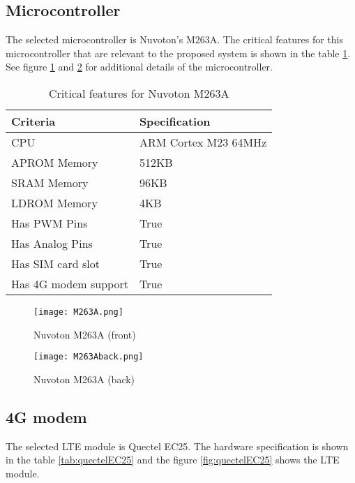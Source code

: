 \documentclass[../thesis.tex]{subfiles}
\begin{document}
\subsection{Microcontroller}

The selected microcontroller is Nuvoton's M263A. The critical features for this microcontroller that are relevant to the proposed system is shown in the table \ref{tab:microcontrollerSpecification}. See figure \ref{fig:m263A} and \ref{fig:m263Aback} for additional details of the microcontroller. 

\begin{table}[h!]
	\begin{center}
		\caption{Critical features for Nuvoton M263A}
		\label{tab:microcontrollerSpecification}
		\begin{tabular}{l|l}
			\toprule
			\textbf{Criteria} & \textbf{Specification}\\
			\midrule
			CPU & ARM Cortex M23 64MHz\\
			APROM Memory & 512KB\\
			SRAM Memory & 96KB\\
			LDROM Memory & 4KB\\
			Has PWM Pins & True\\
			Has Analog Pins & True\\
			Has SIM card slot & True\\
			Has 4G modem support & True\\
			\bottomrule
		\end{tabular}
	\end{center}
\end{table}

\begin{figure}[!ht]
	\texttt{[image: M263A.png]}
	\caption{Nuvoton M263A (front) \cite{Nuvoton}}
	\label{fig:m263A}
\end{figure}

\begin{figure}[!ht]
	\texttt{[image: M263Aback.png]}
	\caption{Nuvoton M263A (back) \cite{Nuvoton}}
	\label{fig:m263Aback}
\end{figure}

\subsection{4G modem}

The selected LTE module is Quectel EC25. The hardware specification is shown in the table \ref{tab:quectelEC25} and the figure \ref{fig:quectelEC25} shows the LTE module. 
\end{document}
